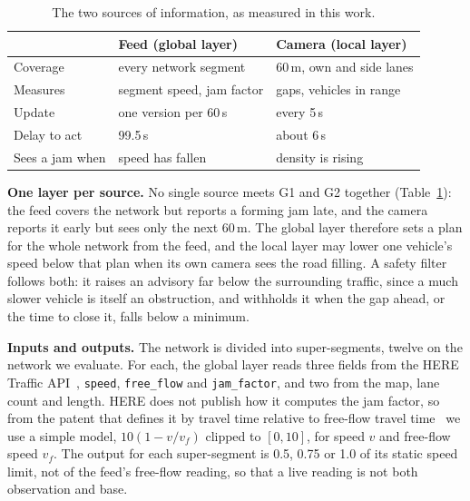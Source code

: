 \begin{table}[t]
\centering
\caption{The two sources of information, as measured in this work.}
\label{tab:sources}
\footnotesize
\setlength{\tabcolsep}{4pt}
\begin{tabular}{@{}lll@{}}
\toprule
 & Feed (global layer) & Camera (local layer) \\
\midrule
Coverage & every network segment & 60\,m, own and side lanes \\
Measures & segment speed, jam factor & gaps, vehicles in range \\
Update & one version per 60\,s & every 5\,s \\
Delay to act & 99.5\,s & about 6\,s \\
Sees a jam when & speed has fallen & density is rising \\
\bottomrule
\end{tabular}
\end{table}

\noindent\textbf{One layer per source.} No single source meets G1 and G2 together (Table~\ref{tab:sources}): the feed covers the network but reports a forming jam late, and the camera reports it early but sees only the next 60\,m. The global layer therefore sets a plan for the whole network from the feed, and the local layer may lower one vehicle's speed below that plan when its own camera sees the road filling. A safety filter follows both: it raises an advisory far below the surrounding traffic, since a much slower vehicle is itself an obstruction, and withholds it when the gap ahead, or the time to close it, falls below a minimum.

\noindent\textbf{Inputs and outputs.} The network is divided into super-segments, twelve on the network we evaluate. For each, the global layer reads three fields from the HERE Traffic API~\cite{here_traffic_api}, \texttt{speed}, \texttt{free\_flow} and \texttt{jam\_factor}, and two from the map, lane count and length. HERE does not publish how it computes the jam factor, so from the patent that defines it by travel time relative to free-flow travel time~\cite{auxer2007rating} we use a simple model, $10(1-v/v_f)$ clipped to $[0,10]$, for speed $v$ and free-flow speed $v_f$. The output for each super-segment is 0.5, 0.75 or 1.0 of its static speed limit, not of the feed's free-flow reading, so that a live reading is not both observation and base.
